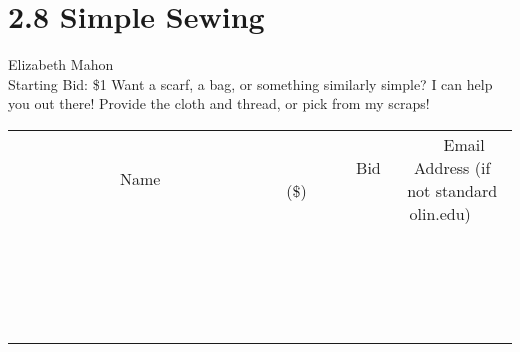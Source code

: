 \documentclass[11pt]{article}
\begin{document}
\section*{2.8 Simple Sewing}
Elizabeth Mahon
\\
Starting Bid: \$1
\newline
Want a scarf, a bag, or something similarly simple? I can help you out there! Provide the cloth and thread, or pick from my scraps!
\\[3ex]
\begin{tabular}{c c c}
~~~~~~~~~~~~~Name~~~~~~~~~~~~~ & ~~~~~~~~~Bid (\$)~~~~~~~~~  & ~~~Email Address (if not standard olin.edu)~~~\\
 & & \\
\hline
 & & \\
\hline
 & & \\
\hline
 & & \\
\hline
 & & \\
\hline
 & & \\
\hline
 & & \\
\hline
 & & \\
\hline
 & & \\
\hline
 & & \\
\hline
 & & \\
\hline
 & & \\
\hline
 & & \\
\hline
 & & \\
\hline
 & & \\
\hline
 & & \\
\hline
 & & \\
\hline
 & & \\
\hline
 & & \\
\hline
\end{tabular}
\newpage
\end{document}

